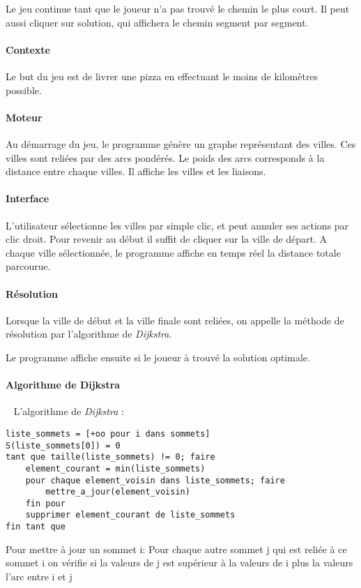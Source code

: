         Le jeu continue tant que le joueur n'a pas trouvé le chemin
        le plus court. Il peut aussi cliquer sur \og solution\fg, qui
        affichera le chemin segment par segment.

        \paragraph{Contexte}
            Le but du jeu est de livrer une pizza en effectuant le moins de kilomètres possible.
        \paragraph{Moteur}
            Au démarrage du jeu, le programme génère un graphe
            représentant des villes. Ces villes sont reliées par des arcs pondérés.
            Le poids des arcs corresponds à la distance entre chaque villes.
            Il affiche les villes et les liaisons.

        \paragraph{Interface}
            L'utilisateur sélectionne les villes par simple clic,
            et peut annuler ses actions par clic droit.
            Pour revenir au début il suffit de cliquer sur la ville de départ.
            A chaque ville sélectionnée, le programme
            affiche en temps réel la distance totale parcourue.

        \paragraph{Résolution}
            Lorsque la ville de début et la ville finale sont reliées,
            on appelle la méthode de résolution par l'algorithme de \emph{Dijkstra}.

            Le programme affiche ensuite si le joueur à trouvé la solution optimale.

		\paragraph{Algorithme de Dijkstra} ~
			L'algorithme de \emph{Dijkstra} :
			\begin{lstlisting}
liste_sommets = [+oo pour i dans sommets]
S(liste_sommets[0]) = 0
tant que taille(liste_sommets) != 0; faire
    element_courant = min(liste_sommets)
    pour chaque element_voisin dans liste_sommets; faire
        mettre_a_jour(element_voisin)
    fin pour
    supprimer element_courant de liste_sommets
fin tant que
			\end{lstlisting}
			Pour mettre à jour un sommet i:
				Pour chaque autre sommet j qui est reliée à ce sommet i on vérifie si
				la valeurs de j est supérieur à la valeurs de i plus la valeurs l'arc entre i et j
				
